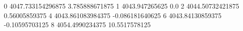 0 4047.733154296875 3.785888671875
1 4043.947265625 0.0
2 4044.50732421875 0.56005859375
4 4043.861083984375 -0.086181640625
6 4043.84130859375 -0.10595703125
8 4054.4990234375 10.5517578125
